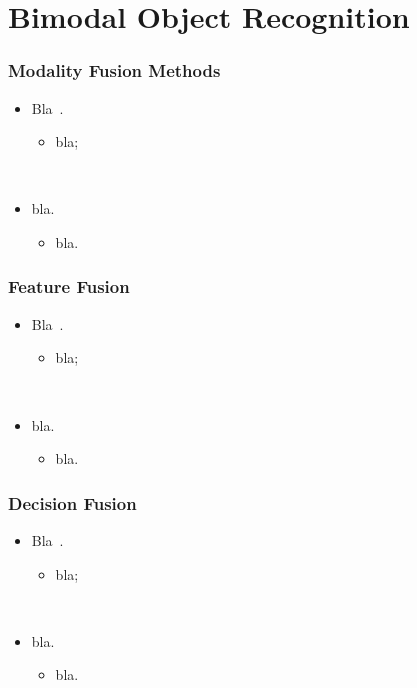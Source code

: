 \documentclass{beamer}
\begin{document}
\section{Bimodal Object Recognition}
\begin{frame}
  \frametitle{Modality Fusion Methods}

  \begin{itemize}
    \item Bla~\cite{rabiner_fundamentals_1993}.
      \begin{itemize}
        \item bla; 
      \end{itemize}
      ~

    \item bla.
      \begin{itemize}
        \item bla.
      \end{itemize}
  \end{itemize}
\end{frame}

\begin{frame}
  \frametitle{Feature Fusion}

  \begin{itemize}
    \item Bla~\cite{rabiner_fundamentals_1993}.
      \begin{itemize}
        \item bla; 
      \end{itemize}
      ~

    \item bla.
      \begin{itemize}
        \item bla.
      \end{itemize}
  \end{itemize}
\end{frame}

\begin{frame}
  \frametitle{Decision Fusion}

  \begin{itemize}
    \item Bla~\cite{rabiner_fundamentals_1993}.
      \begin{itemize}
        \item bla; 
      \end{itemize}
      ~

    \item bla.
      \begin{itemize}
        \item bla.
      \end{itemize}
  \end{itemize}
\end{frame}
\end{document}
